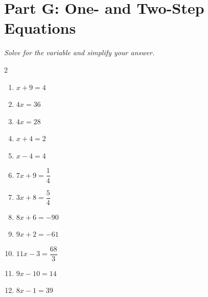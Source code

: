 \documentclass[11pt]{article}
\begin{document}
\section*{Part G: One- and Two-Step Equations}
\noindent\textit{Solve for the variable and simplify your answer.}
\begin{multicols}{2}
\begin{enumerate}
  \item $x + 9 = 4$
  \vspace{1.6cm}
  \item $4x = 36$
  \vspace{1.6cm}
  \item $4x = 28$
  \vspace{1.6cm}
  \item $x + 4 = 2$
  \vspace{1.6cm}
  \item $x - 4 = 4$
  \vspace{1.6cm}
  \item $7x + 9 = \dfrac{1}{4}$
  \vspace{1.6cm}
  \item $3x + 8 = \dfrac{5}{4}$
  \vspace{1.6cm}
  \item $8x + 6 = -90$
  \vspace{1.6cm}
  \item $9x + 2 = -61$
  \vspace{1.6cm}
  \item $11x - 3 = \dfrac{68}{3}$
  \vspace{1.6cm}
  \item $9x - 10 = 14$
  \vspace{1.6cm}
  \item $8x - 1 = 39$
  \vspace{1.6cm}
\end{enumerate}
\end{multicols}
\end{document}
